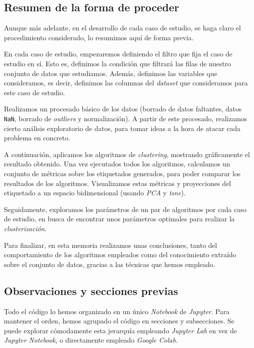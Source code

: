 \documentclass[11pt]{article}
\begin{document}
\subsection{Resumen de la forma de proceder}

Aunque más adelante, en el desarrollo de cada caso de estudio, se haga claro el procedimiento considerado, lo resumimos aquí de forma previa.

En cada caso de estudio, empezaremos definiendo el filtro que fija el caso de estudio en sí. Esto es, definimos la condición que filtrará las filas de nuestro conjunto de datos que estudiamos. Además, definimos las variables que consideramos, es decir, definimos las columnas del \emph{dataset} que consideramos para este caso de estudio.

Realizamos un procesado básico de los datos (borrado de datos faltantes, datos \lstinline{NaN}, borrado de \emph{outliers} y normalización). A partir de este procesado, realizamos cierto análisis exploratorio de datos, para tomar ideas a la hora de atacar cada problema en concreto.

A continuación, aplicamos los algoritmos de \emph{clustering}, mostrando gráficamente el resultado obtenido. Una vez ejecutados todos los algoritmos, calculamos un conjunto de métricas sobre los etiquetados generados, para poder comparar los resultados de los algoritmos. Visualizamos estas métricas y proyecciones del etiquetado a un espacio bidimensional (usando \emph{PCA} y \emph{tsne}).

Seguidamente, exploramos los parámetros de un par de algoritmos por cada caso de estudio, en busca de encontrar unos parámetros optimales para realizar la \emph{clusterización}.

Para finalizar, en esta memoria realizamos unas conclusiones, tanto del comportamiento de los algoritmos empleados como del conocimiento extraído sobre el conjunto de datos, gracias a las técnicas que hemos empleado.

\subsection{Observaciones y secciones previas}

Todo el código lo hemos organizado en un único \emph{Notebook} de \emph{Jupyter}. Para mantener el orden, hemos agrupado el código en secciones y subsecciones. Se puede explorar cómodamente esta jerarquía empleando \emph{Jupyter Lab} en vez de \emph{Jupyter Notebook}, o directamente empleado \emph{Google Colab}.
\end{document}
